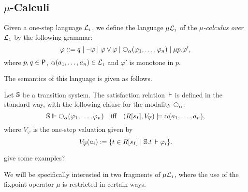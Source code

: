 \subsection{$\mu$-Calculi}

\begin{definition}
Given a one-step language $\mathcal{L}_{\scriptscriptstyle 1}$, we define the language $\mu\mathcal{L}_{\scriptscriptstyle 1}$ of the 
\emph{$\mu$-calculus over $\mathcal{L}_{\scriptscriptstyle 1}$}  by the following grammar:
\[
\varphi ::= q \mid \neg\varphi \mid \varphi\lor\varphi 
   \mid \nxt{\al}(\varphi_{1},\ldots,\varphi_{n})
   \mid \mu p. \varphi',
\]
where $p,q \in\mathsf{P}$, $\alpha(a_{1},\ldots,a_{n}) \in \mathcal{L}_{\scriptscriptstyle 1}$ and $\varphi'$ is 
monotone in $p$.
\end{definition}


\noindent
The semantics of this language is given as follows.

\begin{definition}
Let $\mathbb{S}$ be a transition system.
The satisfaction relation $\Vdash$ is defined in the standard way, with the 
following clause for the modality $\nxt{\alpha}$:
$$
\model \mmodels \nxt{\al}(\varphi_{1},\ldots,\varphi_{n})
\quad\text{iff}\quad 
(R[s_{I}],V_{\overline{\varphi}}) \models \al(a_{1},\ldots,a_{n}),
$$
where $V_{\overline{\varphi}}$ is the one-step valuation given by 
\[
V_{\overline{\varphi}}(a_{i}) := 
  \{ t \in R[s_{I}] \mid \mathbb{S}.t \Vdash \varphi_{i}\}.
\]
\end{definition}

\btbs
\item
give some examples?
\etbs

We will be specifically interested in two fragments of $\mu\mathcal{L}_{\scriptscriptstyle 1}$, where the
use of the fixpoint operator $\mu$ is restricted in certain ways.

